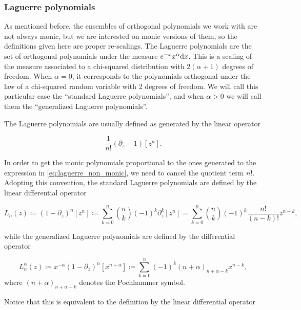 \subsubsection{Laguerre polynomials}

    As mentioned before, the ensembles of orthogonal polynomials we work with are not always monic, but we are interested on monic versions of them, so the definitions given here are proper re-scalings. The Laguerre polynomials are the set of orthogonal polynomials under the measure $e^{-x}x^{\alpha}\mathrm d x$. This is a scaling of the measure associated to a chi-squared distribution with $2(\alpha + 1)$ degrees of freedom. When $\alpha=0$, it corresponds to the polynomials orthogonal under the law of a chi-squared random variable with 2 degrees of freedom. We will call this particular case the ``standard Laguerre polynomials'', and when $\alpha >0$ we will call them the ``generalized Laguerre polynomials''.

    The Laguerre polynomials are usually defined as generated by the linear operator

    \begin{equation} \label{eq:laguerre_non_monic}
        \frac1{n!}\left(\partial_z - 1\right)[z^n].
    \end{equation}

   In order to get the monic polynomials proportional to the ones generated to the expression in \eqref{eq:laguerre_non_monic}, we need to cancel the quotient term $n!$. Adopting this convention, the standard Laguerre polynomials are defined by the linear differential operator 

    \begin{equation*}
        L_n(z) \coloneqq (1 - \partial_z)^n [z^n] \coloneqq \sum_{k=0}^n \binom{n}{k} (-1)^k\partial_z^k[z^n] = \sum_{k=0}^n \binom{n}{k} (-1)^k \frac{n!}{(n-k)!} z^{n-k},
    \end{equation*}

    \noindent while the generalized Laguerre polynomials are defined by the differential operator

    \begin{equation*}
        L_n^{\alpha}(z) \coloneqq x^{-\alpha} \left( 1 - \partial_z \right)^{n}[x^{n+\alpha}] \coloneqq \sum_{k=0}^n(-1)^k (n+\alpha)_{n+\alpha-k} x^{n-k},
    \end{equation*}
    where $(n+\alpha)_{n+\alpha -k}$ denotes the Pochhammer symbol.
    
    Notice that this is equivalent to the definition by the linear differential operator

